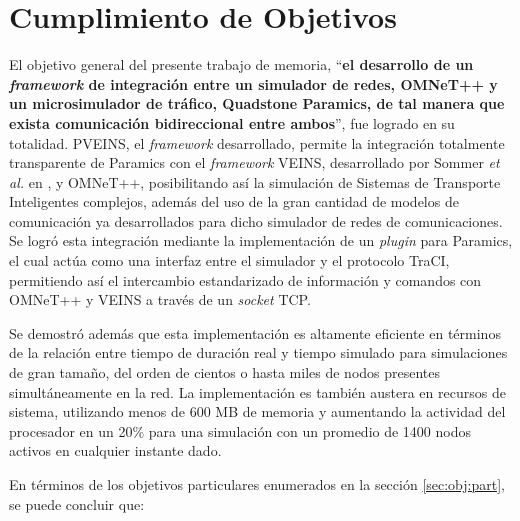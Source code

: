 \section{Cumplimiento de Objetivos}

El objetivo general del presente trabajo de memoria, ``\textbf{el desarrollo de un \textit{framework} de integración entre un simulador de redes, OMNeT++ y un microsimulador de tráfico, Quadstone Paramics, de tal manera que exista comunicación bidireccional entre ambos}'', fue logrado en su totalidad. PVEINS, el \emph{framework} desarrollado, permite la integración totalmente transparente de Paramics con el \emph{framework} VEINS, desarrollado por Sommer \emph{et al.} en \autocite{sommer_german_dressler}, y OMNeT++, posibilitando así la simulación de Sistemas de Transporte Inteligentes complejos, además del uso de la gran cantidad de modelos de comunicación ya desarrollados para dicho simulador de redes de comunicaciones. 
Se logró esta integración mediante la implementación de un \emph{plugin} para Paramics, el cual actúa como una interfaz entre el simulador y el protocolo TraCI, permitiendo así el intercambio estandarizado de información y comandos con OMNeT++ y VEINS a través de un \emph{socket} TCP. 

Se demostró además que esta implementación es altamente eficiente en términos de la relación entre tiempo de duración real y tiempo simulado para simulaciones de gran tamaño, del orden de cientos o hasta miles de nodos presentes simultáneamente en la red. 
La implementación es también austera en recursos de sistema, utilizando menos de 600 MB de memoria y aumentando la actividad del procesador en un 20\% para una simulación con un promedio de 1400 nodos activos en cualquier instante dado.

En términos de los objetivos particulares enumerados en la sección \ref{sec:obj:part}, se puede concluir que:

